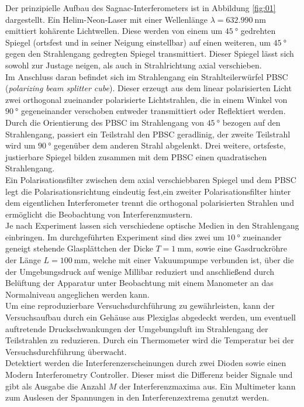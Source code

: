 \noindent Der prinzipielle Aufbau des Sagnac-Interferometers ist in Abbildung
\ref{fig:01} dargestellt. Ein Helim-Neon-Laser mit einer Wellenlänge
$\lambda = \SI{632.990}{\nano\meter}$ emittiert kohärente Lichtwellen. Diese
werden von einem um $\SI{45}{\degree}$ gedrehten Spiegel (ortsfest und in seiner
Neigung einstellbar) auf einen weiteren, um $\SI{45}{\degree}$ gegen den
Strahlengang gedregten Spiegel transmittiert. Dieser Spiegel lässt sich sowohl
zur Justage neigen, als auch in Strahlrichtung axial verschieben. \\
\noindent Im Anschluss daran befindet sich im Strahlengang ein Strahlteilerwürfel
PBSC (\textit{polarizing beam splitter cube}). Dieser erzeugt aus dem linear
polarisierten Licht zwei orthogonal zueinander polarisierte Lichtstrahlen, die
in einem Winkel von $\SI{90}{\degree}$ gegeneinander verschoben entweder
transmittiert oder Reflektiert werden. Durch die Orientierung des PBSC im
Strahlengang von $\SI{45}{\degree}$ bezogen auf den Strahlengang, passiert ein
Teilstrahl den PBSC geradlinig, der zweite Teilstrahl wird um $\SI{90}{\degree}$
gegenüber dem anderen Strahl abgelenkt. Drei weitere, ortsfeste, justierbare
Spiegel bilden zusammen mit dem PBSC einen quadratischen Strahlengang. \\
\noindent Ein Polarisationsfilter zwischen dem axial verschiebbaren Spiegel und
dem PBSC legt die Polarisationsrichtung eindeutig fest,ein zweiter
Polarisationsfilter hinter dem eigentlichen Interferometer trennt die
orthogonal polarisierten Strahlen und ermöglicht die Beobachtung von
Interferenzmustern. \\
\noindent Je nach Experiment lassen sich verschiedene optische Medien in den
Strahlengang einbringen. Im durchgeführten Experiment sind dies zwei um
$\SI{10}{\degree}$ zueinander geneigt stehende Glasplättchen der Dicke
$T=\SI{1}{\milli\meter}$, sowie eine Gasdruckröhre der Länge
$L = \SI{100}{\milli\meter}$, welche mit einer Vakuumpumpe verbunden ist, über
die der Umgebungsdruck auf wenige Millibar reduziert und anschließend durch
Belüftung der Apparatur unter Beobachtung mit einem Manometer an das Normalniveau
angeglichen werden kann. \\
\noindent Um eine reproduzierbare Versuchsdurchführung zu gewährleisten, kann der
Versuchsaufbau durch ein Gehäuse aus Plexiglas abgedeckt werden, um eventuell
auftretende Druckschwankungen der Umgebungsluft im Strahlengang der Teilstrahlen
zu reduzieren. Durch ein Thermometer wird die Temperatur bei der
Versuchsdurchführung überwacht.  \\
\noindent Detektiert werden die Interferenzerscheinungen durch zwei Dioden
sowie einen Modern Interferometry Controller. Dieser misst die Differenz beider
Signale und gibt als Ausgabe die Anzahl $M$ der Interferenzmaxima aus. Ein
Multimeter kann zum Auslesen der Spannungen in den Interferenzextrema genutzt
werden. \\
